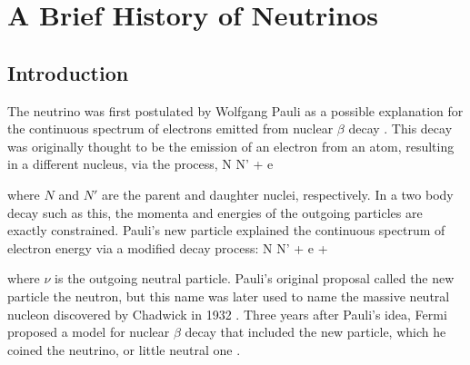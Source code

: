 
\chapter{A Brief History of Neutrinos}
\label{ch:Hist}


\section{Introduction}
\label{sec:HistIntro}

The neutrino was first postulated by Wolfgang Pauli as a possible explanation for the continuous spectrum of electrons emitted from nuclear $\beta$ decay \cite{ref:Pauli}. This decay was originally thought to be the emission of an electron from an atom, resulting in a different nucleus, via the process,
\beq
N \rightarrow N' + e
\label{eq:BetaWrong}
\eeq

\n where $N$ and $N'$ are the parent and daughter nuclei, respectively. In a two body decay such as this, the momenta and energies of the outgoing particles are exactly constrained. Pauli's new particle explained the continuous spectrum of electron energy via a modified decay process:
\beq
N \rightarrow N' + e + \nu
\label{eq:BetaRight}
\eeq

\n where $\nu$ is the outgoing neutral particle. Pauli's original proposal called the new particle the neutron, but this name was later used to name the massive neutral nucleon discovered by Chadwick in 1932 \cite{ref:Chadwick}. Three years after Pauli's idea, Fermi proposed a model for nuclear $\beta$ decay that included the new particle, which he coined the neutrino, or little neutral one \cite{ref:Fermi}.

